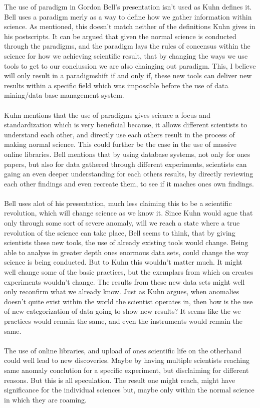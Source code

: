 \documentclass[paper=a4, fontsize=11pt]{scrartcl} %
\numberwithin{equation}{section} %
\numberwithin{figure}{section} %
\numberwithin{table}{section} %
\begin{document}
	The use of paradigm in Gordon Bell's presentation isn't used as Kuhn defines it. Bell uses a paradigm merly as a way to define how we gather information within science. As mentioned, this doesn't match neither of the definitions Kuhn gives in his postscripts. It can be argued that given the normal science is conducted through the paradigms, and the paradigm lays the rules of concensus within the science for how we achieving scientific result, that by changing the ways we use tools to get to our conclussion we are also chainging out paradigm. This, I believe will only result in a paradigmshift if and only if, these new tools can deliver new results within a specific field which was impossible before the use of data mining/data base management system. 
	\\ \\
	Kuhn mentions that the use of paradigms gives science a focus and standardization which is very beneficial because, it allows different scientists to understand each other, and directly use each others result in the process of making normal science. This could further be the case in the use of massive online libraries. Bell mentions that by using database systems, not only for ones papers, but also for data gathered through different experiments, scientists can gaing an even deeper understanding for each others results, by directly reviewing each other findings and even recreate them, to see if it maches ones own findings. 
	\\ \\
	Bell uses alot of his presentation, much less claiming this to be a scientific revolution, which will change science as we know it. Since Kuhn would ague that only through some sort of severe anomaly, will we reach a state where a true revolution of the science can take place, Bell seems to think, that by giving scientists these new tools, the use of already existing tools would change. Being able to analyse in greater depth ones enormous data sets, could change the way science is being conducted. But to Kuhn this wouldn't matter much. It might well change some of the basic practices, but the exemplars from which on creates experiments wouldn't change. The results from these new data sets might well only reconfirm what we already know. Just as Kuhn argues, when anomalies doesn't quite exist within the world the scientist operates in, then how is the use of new categorization of data going to show new results? It seems like the we practices would remain the same, and even the instruments would remain the same.
	\\ \\
	The use of online libraries, and upload of ones scientific life on the otherhand could well lead to new discoveries. Maybe by having multiple scientists reaching same anomaly conclution for a specific experiment, but disclaiming for different reasons. But this is all speculation. The result one might reach, might have significance for the individual sciences but, maybe only within the normal science in which they are roaming.  
	
\end{document}
